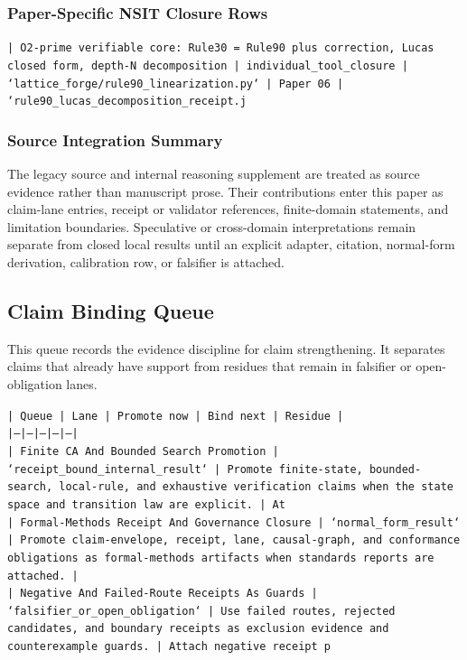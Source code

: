 \documentclass[11pt]{article}
\begin{document}
\subsubsection*{Paper-Specific NSIT Closure Rows}

\noindent\texttt{| O2-prime verifiable core: Rule30 = Rule90 plus correction, Lucas closed form, depth-N decomposition | individual\_tool\_closure | `lattice\_forge/rule90\_linearization.py` | Paper 06 | `rule90\_lucas\_decomposition\_receipt.j}\\

\subsubsection*{Source Integration Summary}

The legacy source and internal reasoning supplement are treated as source
evidence rather than manuscript prose. Their contributions enter this paper as
claim-lane entries, receipt or validator references, finite-domain statements,
and limitation boundaries. Speculative or cross-domain interpretations remain
separate from closed local results until an explicit adapter, citation,
normal-form derivation, calibration row, or falsifier is attached.
\subsection*{Claim Binding Queue}

This queue records the evidence discipline for claim strengthening. It separates claims that already have support from residues that remain in falsifier or open-obligation lanes.

\noindent\texttt{| Queue | Lane | Promote now | Bind next | Residue |}\\
\noindent\texttt{|---|---|---|---|---|}\\
\noindent\texttt{| Finite CA And Bounded Search Promotion | `receipt\_bound\_internal\_result` | Promote finite-state, bounded-search, local-rule, and exhaustive verification claims when the state space and transition law are explicit. | At}\\
\noindent\texttt{| Formal-Methods Receipt And Governance Closure | `normal\_form\_result` | Promote claim-envelope, receipt, lane, causal-graph, and conformance obligations as formal-methods artifacts when standards reports are attached. |}\\
\noindent\texttt{| Negative And Failed-Route Receipts As Guards | `falsifier\_or\_open\_obligation` | Use failed routes, rejected candidates, and boundary receipts as exclusion evidence and counterexample guards. | Attach negative receipt p}\\
\end{document}
